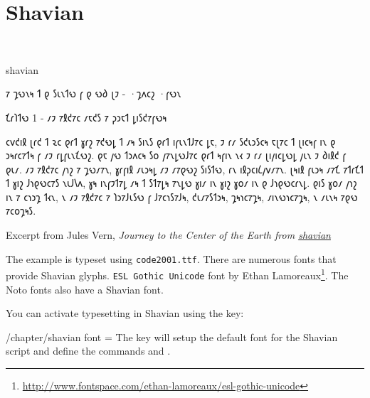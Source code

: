 \section{Shavian}
\label{s:shavian}
\def\shaviansetup#1{}
\newfontfamily{}
^^A\newfontfamily{}
\cxset{shavian font/.code=\shaviansetup{#1}}




\begin{scriptexample}[]{shavian}
\shavian

𐑳 𐑡𐑻𐑯𐑰 𐑑 𐑞 𐑕𐑧𐑯𐑑𐑻 𐑝 𐑞 𐑻𐑔
𐑚𐑲 - ·𐑡𐑵𐑤𐑟 ·𐑝𐑻𐑯

𐑗𐑩𐑐𐑑𐑻 1 - 𐑥𐑲 𐑳𐑙𐑒𐑳𐑤 𐑥𐑱𐑒𐑕 𐑳 𐑜𐑮𐑱𐑑 𐑛𐑦𐑕𐑒𐑳𐑝𐑻𐑰

     𐑤𐑫𐑒𐑦𐑙 𐑚𐑩𐑒 𐑑 𐑷𐑤 𐑞𐑩𐑑 𐑣𐑩𐑟 𐑳𐑒𐑻𐑛 𐑑 𐑥𐑰 𐑕𐑦𐑯𐑕 𐑞𐑩𐑑 𐑦𐑝𐑧𐑯𐑑𐑓𐑳𐑤 𐑛𐑱, 𐑲 𐑩𐑥 𐑕𐑒𐑧𐑮𐑕𐑤𐑰 𐑱𐑚𐑳𐑤 𐑑 𐑚𐑦𐑤𐑰𐑝 𐑦𐑯 𐑞 𐑮𐑰𐑩𐑤𐑳𐑑𐑰 𐑝 𐑥𐑲 𐑩𐑛𐑝𐑧𐑯𐑗𐑻𐑟. 𐑞𐑱 𐑢𐑻 𐑑𐑮𐑵𐑤𐑰 𐑕𐑴 𐑢𐑳𐑯𐑛𐑻𐑓𐑳𐑤 𐑞𐑩𐑑 𐑰𐑝𐑦𐑯 𐑯𐑬 𐑲 𐑩𐑥 𐑚𐑦𐑢𐑦𐑤𐑛𐑻𐑛 𐑢𐑧𐑯 𐑲 𐑔𐑦𐑙𐑒 𐑝 𐑞𐑧𐑥.
     𐑥𐑲 𐑳𐑙𐑒𐑳𐑤 𐑢𐑪𐑟 𐑳 𐑡𐑻𐑥𐑳𐑯, 𐑣𐑩𐑝𐑦𐑙 𐑥𐑧𐑮𐑰𐑛 𐑥𐑲 𐑥𐑳𐑞𐑻𐑟 𐑕𐑦𐑕𐑑𐑻, 𐑩𐑯 𐑦𐑙𐑜𐑤𐑦𐑖𐑢𐑫𐑥𐑳𐑯. 𐑚𐑰𐑦𐑙 𐑝𐑧𐑮𐑰 𐑥𐑳𐑗 𐑳𐑑𐑩𐑗𐑑 𐑑 𐑣𐑦𐑟 𐑓𐑪𐑞𐑻𐑤𐑳𐑕 𐑯𐑧𐑓𐑘𐑵, 𐑣𐑰 𐑦𐑯𐑝𐑲𐑑𐑳𐑛 𐑥𐑰 𐑑 𐑕𐑑𐑳𐑛𐑰 𐑳𐑯𐑛𐑻 𐑣𐑦𐑥 𐑦𐑯 𐑣𐑦𐑟 𐑣𐑴𐑥 𐑦𐑯 𐑞 𐑓𐑪𐑞𐑻𐑤𐑩𐑯𐑛. 𐑞𐑦𐑕 𐑣𐑴𐑥 𐑢𐑪𐑟 𐑦𐑯 𐑳 𐑤𐑪𐑮𐑡 𐑑𐑬𐑯, 𐑯 𐑥𐑲 𐑳𐑙𐑒𐑳𐑤 𐑳 𐑐𐑮𐑳𐑓𐑧𐑕𐑻 𐑝 𐑓𐑳𐑤𐑪𐑕𐑳𐑓𐑰, 𐑒𐑧𐑥𐑳𐑕𐑑𐑮𐑰, 𐑡𐑰𐑪𐑤𐑳𐑡𐑰, 𐑥𐑦𐑯𐑻𐑪𐑤𐑳𐑡𐑰, 𐑯 𐑥𐑧𐑯𐑰 𐑳𐑞𐑻 𐑳𐑤𐑴𐑡𐑰𐑕.

\arial

\hfill Excerpt from Jules Vern,  \textit{Journey to the Center of the Earth from \href{http://shavian.weebly.com/}{shavian}}
\end{scriptexample}

The example is typeset using \texttt{code2001.ttf}. There are numerous fonts that provide Shavian glyphs. \texttt{ESL Gothic Unicode} font by Ethan Lamoreaux\footnote{\url{http://www.fontspace.com/ethan-lamoreaux/esl-gothic-unicode}}. The Noto fonts also have a Shavian font. 

You can activate typesetting in Shavian using the key:

\begin{key}{/chapter/shavian font = } The key will setup the
default font for the Shavian script and define the commands \cmd{\shavian} and \cmd{\textshavian}. 
\end{key}





